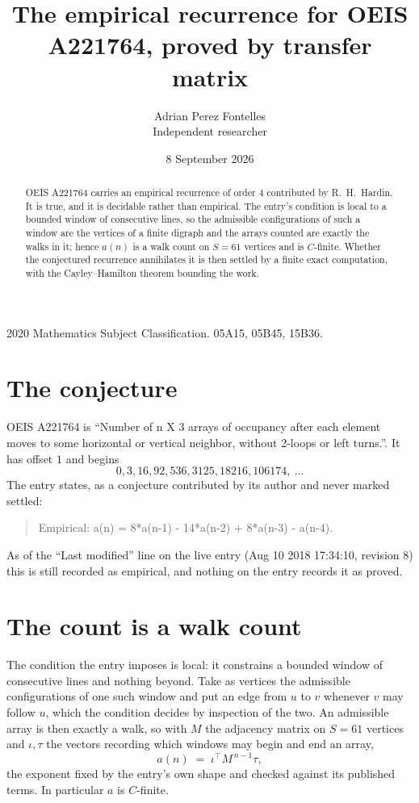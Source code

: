 \documentclass[11pt,a4paper]{article}
\title{The empirical recurrence for OEIS A221764, proved by transfer matrix}
\author{Adrian Perez Fontelles\\ \small Independent researcher}
\date{8 September 2026}
\theoremstyle{plain}
\theoremstyle{definition}
\begin{document}
\maketitle

\begin{abstract}
OEIS A221764 carries an empirical recurrence of order $4$ contributed by R.~H.~Hardin. It is
true, and it is decidable rather than empirical. The entry's condition is local to a bounded window of consecutive lines, so
the admissible configurations of such a window are the vertices of a finite digraph and the
arrays counted are exactly the walks in it; hence $a(n)$ is a walk count on $S=61$ vertices
and is $C$-finite. Whether the conjectured recurrence annihilates it is then settled by a
finite exact computation, with the Cayley--Hamilton theorem bounding the work.
\end{abstract}

\noindent\small 2020 Mathematics Subject Classification. 05A15, 05B45, 15B36.\normalsize

\section{The conjecture}

OEIS A221764 is ``Number of n X 3 arrays of occupancy after each element moves to some horizontal or vertical neighbor, without 2-loops or left turns.''. It has offset $1$ and begins
\[
0, 3, 16, 92, 536, 3125, 18216, 106174,\ \dots
\]
The entry states, as a conjecture contributed by its author and never marked settled:
\begin{quote}
Empirical: a(n) = 8*a(n-1) - 14*a(n-2) + 8*a(n-3) - a(n-4).
\end{quote}
As of the ``Last modified'' line on the live entry (Aug 10 2018 17:34:10, revision 8) this is still
recorded as empirical, and nothing on the entry records it as proved.

\section{The count is a walk count}

The condition the entry imposes is local: it constrains a bounded window of consecutive lines and nothing beyond. Take as
vertices the admissible configurations of one such window and put an edge from $u$ to $v$
whenever $v$ may follow $u$, which the condition decides by inspection of the two. An
admissible array is then exactly a walk, so with $M$ the adjacency matrix on $S=61$ vertices
and $\iota,\tau$ the vectors recording which windows may begin and end an array,
\[
a(n)\;=\;\iota^{\!\top}M^{\,n-1}\tau ,
\]
the exponent fixed by the entry's own shape and checked against its published terms. In
particular $a$ is $C$-finite.
\end{document}
